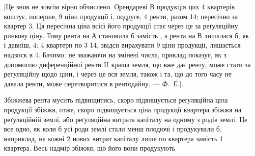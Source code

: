 [Це знов не зовсім вірно обчислено. Орендареві $В$ продукція цих 4 квартерів
коштує, поперше, 9 ціни продукції і, подруге,
4 ренти, разом 14; пересічно за квартер 3.
Ця пересічна ціна всієї його продукції стає через це за реґуляційну ринкову ціну. Тому рента на
$А$ становила б  замість , а рента на $В$ лишалася б, як і давніш, 4: 4 квартерн по 3 \deq{} 14, звідси вирахувати
9 ціни продукції, лишається надзиск в 4. Бачимо: не
зважаючи на змінені числа, приклад показує, як з допомогою диференційноі
ренти II краща земля, що вже дає ренту, може стати за регуляційну щодо ціни,
і через це вся земля, також і та, що до того часу не давала ренти, може перетворитися
в рентодайну. — \emph{Ф.~Е.}].

Збіжжева рента мусить підвищитись, скоро підвищується реґуляційна
ціна продукції збіжжя, отже, скоро підвищується ціна продукції квартера збіжжя
на реґуляційній землі, або реґуляційна витрата капіталу на одному з родів
землі. Це все одно, як коли б усі роди землі стали менш плодючі і продукували
б, наприклад, на кожні 2 нових витрат капіталу лише по 
квартера замість 1 квартера. Весь надмір збіжжя, що його вони продукують
\parbreak{}  %
